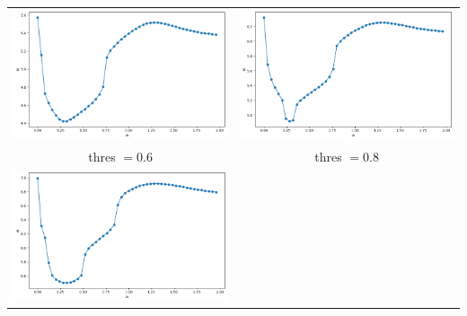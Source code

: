 \documentclass[a4paper,preprint,11pt]{article}
\begin{document}
\begin{center}
\begin{tabular}{cc}
\includegraphics[scale=0.35]{Corba_y-y0_z-z0_0_6.png} &
\includegraphics[scale=0.35]{Corba_y-y0_z-z0_0_8.png} \\
thres $=0.6$ & thres $=0.8$ \\
\includegraphics[scale=0.35]{Corba_y-y0_z-z0_1.png} &

\end{tabular}
\end{center}
\end{document}
